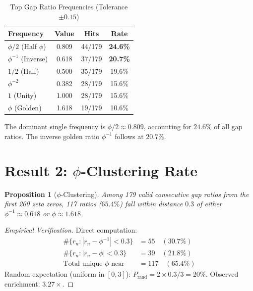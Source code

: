 \documentclass[11pt,a4paper]{article}
\newtheorem{proposition}[theorem]{Proposition}
\begin{document}
\begin{table}[H]
\centering
\caption{Top Gap Ratio Frequencies (Tolerance $\pm 0.15$)}
\label{tab:frequencies}
\begin{tabular}{@{}lccc@{}}
\toprule
\textbf{Frequency} & \textbf{Value} & \textbf{Hits} & \textbf{Rate} \\
\midrule
$\phi/2$ (Half $\phi$) & 0.809 & 44/179 & \textbf{24.6\%} \\
$\phi^{-1}$ (Inverse) & 0.618 & 37/179 & \textbf{20.7\%} \\
$1/2$ (Half) & 0.500 & 35/179 & 19.6\% \\
$\phi^{-2}$ & 0.382 & 28/179 & 15.6\% \\
$1$ (Unity) & 1.000 & 28/179 & 15.6\% \\
$\phi$ (Golden) & 1.618 & 19/179 & 10.6\% \\
\bottomrule
\end{tabular}
\end{table}

The dominant single frequency is $\phi/2 \approx 0.809$, accounting for $24.6\%$ of all gap ratios. The inverse golden ratio $\phi^{-1}$ follows at $20.7\%$.

\newpage

\section{Result 2: $\phi$-Clustering Rate}
\label{sec:clustering}

\begin{proposition}[$\phi$-Clustering]
\label{prop:clustering}
Among 179 valid consecutive gap ratios from the first 200 zeta zeros, 117 ratios ($65.4\%$) fall within distance $0.3$ of either $\phi^{-1} \approx 0.618$ or $\phi \approx 1.618$.
\end{proposition}

\begin{proof}[Empirical Verification]
Direct computation:
\begin{align*}
\#\{r_n : |r_n - \phi^{-1}| < 0.3\} &= 55 \quad (30.7\%) \\
\#\{r_n : |r_n - \phi| < 0.3\} &= 39 \quad (21.8\%) \\
\text{Total unique $\phi$-near} &= 117 \quad (65.4\%)
\end{align*}
Random expectation (uniform in $[0,3]$): $P_{\text{rand}} = 2 \times 0.3 / 3 = 20\%$. Observed enrichment: $3.27\times$.
\end{proof}
\end{document}

